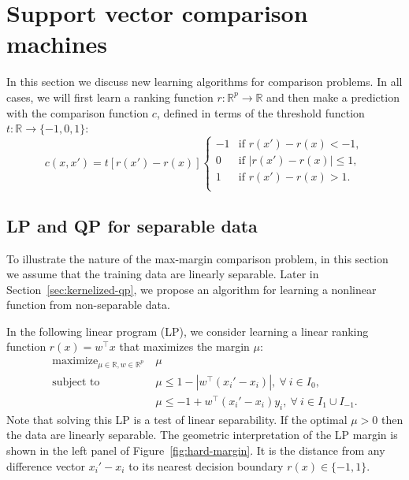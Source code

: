 \documentclass{article}
\newcommand{\RR}{\mathbb R}
\DeclareMathOperator*{\maximize}{maximize}
\begin{document}
\section{Support vector comparison machines}
\label{sec:svm-compare}

In this section we discuss new learning algorithms for comparison
problems. In all cases, we will first learn a ranking function
$r:\RR^p\rightarrow\RR$ and then make a prediction with the comparison
function $c$, defined in terms of the threshold function
$t:\RR\rightarrow\{-1,0,1\}$:
\begin{equation}
  \label{eq:compare_threshold}
  c(x, x') =
  t\left[
    r(x')-r(x)
  \right]
  \begin{cases}
    -1 & \text{if } r(x') - r(x) < -1, \\
    0 & \text{if } |r(x') - r(x)| \leq 1, \\
    1 & \text{if } r(x') - r(x) > 1. \\
  \end{cases}
\end{equation}

\subsection{LP and QP for separable data}
\label{sec:lp-qp}

To illustrate the nature of the max-margin comparison problem, in this
section we assume that the training data are linearly separable. Later
in Section~\ref{sec:kernelized-qp}, we propose an algorithm for
learning a nonlinear function from non-separable data.

In the following linear program (LP), we consider learning a linear
ranking function $r(x)=w^\intercal x$ that maximizes the margin $\mu$:
\begin{equation}
  \label{eq:max-margin-lp}
  \begin{aligned}
    \maximize_{\mu\in\RR, w\in\RR^p}\ & \mu \\
    \text{subject to}\ & \mu \leq 1-|w^\intercal (x_i' - x_i)|,\
    \forall\  i\in I_0,\\
    &\mu \leq -1 +  w^\intercal(x_i'-x_i)y_i,\ \forall\ i\in I_1\cup I_{-1}.
  \end{aligned}
\end{equation}
Note that solving this LP is a test of linear separability. If the
optimal $\mu>0$ then the data are linearly separable. The geometric
interpretation of the LP margin is shown in the left panel of
Figure~\ref{fig:hard-margin}. It is the distance from any difference
vector $x_i'-x_i$ to its nearest decision boundary $r(x)\in\{-1,1\}$.
\end{document}
